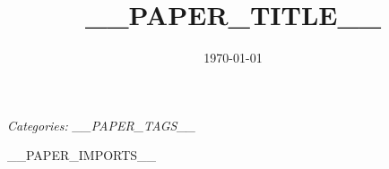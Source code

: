 \documentclass{banko}
\title{__PAPER_TITLE__}
\date{\today}
\begin{document}
\maketitle

\romanPage

\tableofcontents

\textit{Categories: __PAPER_TAGS__}

\clearpage
\arabicPage

\togglelayout


__PAPER_IMPORTS__

\newpage
\end{document}

